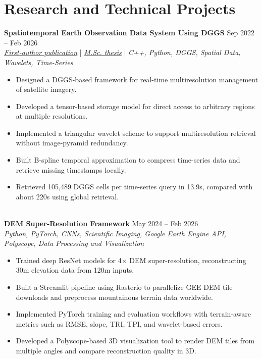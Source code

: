 \documentclass[a4paper,10pt]{article}
\begin{document}

\section*{Research and Technical Projects}

\noindent
\textbf{Spatiotemporal Earth Observation Data System Using DGGS} \hfill Sep 2022 -- Feb 2026 \\
\textit{\href{https://doi.org/10.3390/rs17040570}{First-author publication}} | \textit{\href{https://ucalgary.scholaris.ca/items/114b394b-e516-4732-bd3a-45dd6160d480}{M.Sc. thesis}} | \textit{C++, Python, DGGS, Spatial Data, Wavelets, Time-Series}
\begin{itemize}[leftmargin=0.25in]
    \item Designed a DGGS-based framework for real-time multiresolution management of satellite imagery.
    \item Developed a tensor-based storage model for direct access to arbitrary regions at multiple resolutions.
    \item Implemented a triangular wavelet scheme to support multiresolution retrieval without image-pyramid redundancy.
    \item Built B-spline temporal approximation to compress time-series data and retrieve missing timestamps locally.
    \item Retrieved 105,489 DGGS cells per time-series query in 13.9s, compared with about 220s using global retrieval.
\end{itemize}

\noindent \\
\textbf{DEM Super-Resolution Framework} \hfill May 2024 -- Feb 2026 \\
\textit{Python, PyTorch, CNNs, Scientific Imaging, Google Earth Engine API, Polyscope, Data Processing and Visualization}
\begin{itemize}[leftmargin=0.25in]
    \item Trained deep ResNet models for 4$\times$ DEM super-resolution, reconstructing 30m elevation data from 120m inputs.
    \item Built a Streamlit pipeline using Rasterio to parallelize GEE DEM tile downloads and preprocess mountainous terrain data worldwide.
    \item Implemented PyTorch training and evaluation workflows with terrain-aware metrics such as RMSE, slope, TRI, TPI, and wavelet-based errors.
    \item Developed a Polyscope-based 3D visualization tool to render DEM tiles from multiple angles and compare reconstruction quality in 3D.
\end{itemize}
\end{document}
